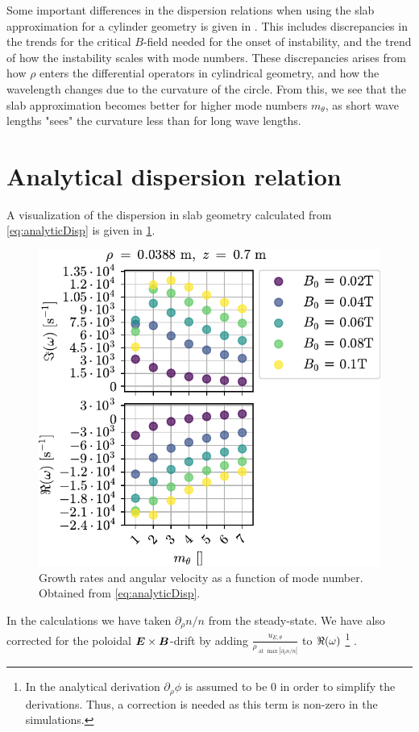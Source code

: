 %
Some important differences in the dispersion relations when using the slab approximation for a cylinder geometry is given in \cite{Ellis1980}.
This includes discrepancies in the trends for the critical $B$-field needed for the onset of instability, and the trend of how the instability scales with mode numbers.
These discrepancies arises from how $\rho$ enters the differential operators in cylindrical geometry, and how the wavelength changes due to the curvature of the circle.
From this, we see that the slab approximation becomes better for higher mode numbers $m_\theta$, as short wave lengths "sees" the curvature less than for long wave lengths.

\section{Analytical dispersion relation}
\label{sec:analDisp}
%
A visualization of the dispersion in slab geometry calculated from \cref{eq:analyticDisp} is given in \cref{fig:grAnalytic}.
%
\begin{figure}[htb]
    \centering
    \includegraphics{fig/results/growthRates/growthRatesAnalyticB0}
    \caption{Growth rates and angular velocity as a function of mode number.
        Obtained from \cref{eq:analyticDisp}.}
    \label{fig:grAnalytic}
\end{figure}
%
In the calculations we have taken $\partial_\rho n/n$ from the steady-state.
We have also corrected for the poloidal $\boldsymbol{E}\times\boldsymbol{B}$-drift by adding $\frac{u_{E,\theta}}{\rho_{\text{ at }\max|\partial_\rho n/n|}}$ to $\Re(\omega)$%
\footnote{
    In the analytical derivation $\partial_\rho \phi$ is assumed to be $0$ in order to simplify the derivations.
    Thus, a correction is needed as this term is non-zero in the simulations.
}
%
.

